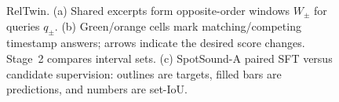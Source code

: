 \begin{figure}[t]
\centering

\caption{RelTwin. (a) Shared excerpts form opposite-order windows $W_\pm$ for queries $q_\pm$. (b) Green/orange cells mark matching/competing timestamp answers; arrows indicate the desired score changes. Stage~2 compares interval sets. (c) SpotSound-A paired SFT versus candidate supervision: outlines are targets, filled bars are predictions, and numbers are set-IoU.}
\label{fig:pair}
\end{figure}
